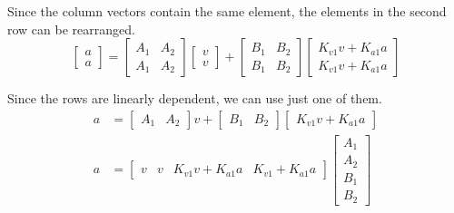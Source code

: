 Since the column vectors contain the same element, the elements in the second
row can be rearranged.
\begin{equation*}
  \begin{bmatrix}
    a \\
    a
  \end{bmatrix} =
  \begin{bmatrix}
    A_1 & A_2 \\
    A_1 & A_2
  \end{bmatrix}
  \begin{bmatrix}
    v \\
    v
  \end{bmatrix} +
  \begin{bmatrix}
    B_1 & B_2 \\
    B_1 & B_2
  \end{bmatrix}
  \begin{bmatrix}
    K_{v1} v + K_{a1} a \\
    K_{v1} v + K_{a1} a
  \end{bmatrix}
\end{equation*}

Since the rows are linearly dependent, we can use just one of them.
\begin{align*}
  a &=
    \begin{bmatrix}
      A_1 & A_2
    \end{bmatrix} v +
    \begin{bmatrix}
      B_1 & B_2
    \end{bmatrix}
    \begin{bmatrix}
      K_{v1} v + K_{a1} a
    \end{bmatrix} \\
  a &=
    \begin{bmatrix}
      v & v & K_{v1} v + K_{a1} a & K_{v1} + K_{a1} a
    \end{bmatrix}
    \begin{bmatrix}
      A_1 \\
      A_2 \\
      B_1 \\
      B_2
    \end{bmatrix}
\end{align*}

